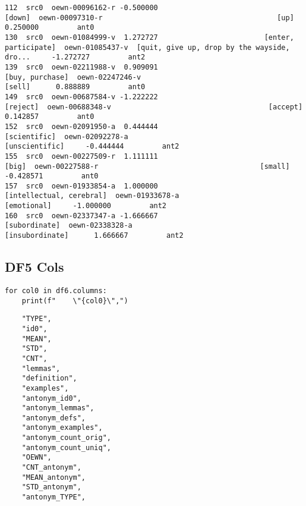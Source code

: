 \documentclass[a4paper,10pt,onecolumn,oneside,openright]{article}
\begin{document}
\begin{verbatim}
112  src0  oewn-00096162-r -0.500000                                       [down]  oewn-00097310-r                                         [up]      0.250000         ant0
130  src0  oewn-01084999-v  1.272727                         [enter, participate]  oewn-01085437-v  [quit, give up, drop by the wayside, dro...     -1.272727         ant2
139  src0  oewn-02211988-v  0.909091                              [buy, purchase]  oewn-02247246-v                                       [sell]      0.888889         ant0
149  src0  oewn-00687584-v -1.222222                                     [reject]  oewn-00688348-v                                     [accept]      0.142857         ant0
152  src0  oewn-02091950-a  0.444444                                 [scientific]  oewn-02092278-a                               [unscientific]     -0.444444         ant2
155  src0  oewn-00227509-r  1.111111                                        [big]  oewn-00227588-r                                      [small]     -0.428571         ant0
157  src0  oewn-01933854-a  1.000000                     [intellectual, cerebral]  oewn-01933678-a                                  [emotional]     -1.000000         ant2
160  src0  oewn-02337347-a -1.666667                                [subordinate]  oewn-02338328-a                              [insubordinate]      1.666667         ant2
\end{verbatim}
\subsection{DF5 Cols}
\label{sec:orge9304d0}
\begin{verbatim}
for col0 in df6.columns:
    print(f"    \"{col0}\",")
\end{verbatim}

\begin{verbatim}
    "TYPE",
    "id0",
    "MEAN",
    "STD",
    "CNT",
    "lemmas",
    "definition",
    "examples",
    "antonym_id0",
    "antonym_lemmas",
    "antonym_defs",
    "antonym_examples",
    "antonym_count_orig",
    "antonym_count_uniq",
    "OEWN",
    "CNT_antonym",
    "MEAN_antonym",
    "STD_antonym",
    "antonym_TYPE",
\end{verbatim}
\end{document}
